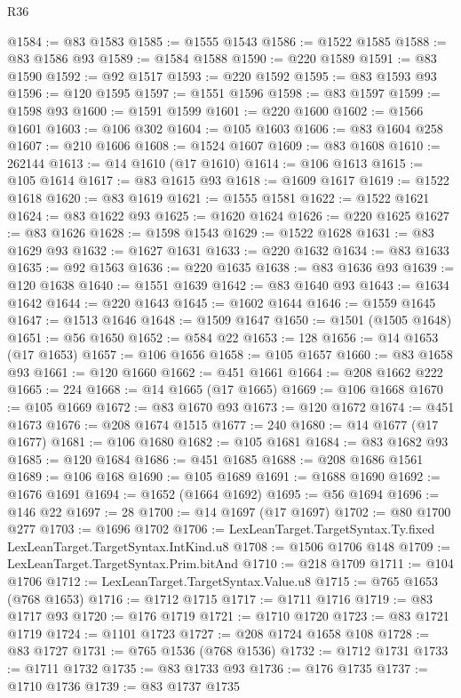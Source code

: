 \begin{lexlean}{R36}
\begin{coremodule}
@1584 := @83 @1583
@1585 := @1555 @1543
@1586 := @1522 @1585
@1588 := @83 @1586 @93
@1589 := @1584 @1588
@1590 := @220 @1589
@1591 := @83 @1590
@1592 := @92 @1517
@1593 := @220 @1592
@1595 := @83 @1593 @93
@1596 := @120 @1595
@1597 := @1551 @1596
@1598 := @83 @1597
@1599 := @1598 @93
@1600 := @1591 @1599
@1601 := @220 @1600
@1602 := @1566 @1601
@1603 := @106 @302
@1604 := @105 @1603
@1606 := @83 @1604 @258
@1607 := @210 @1606
@1608 := @1524 @1607
@1609 := @83 @1608
@1610 := 262144
@1613 := @14 @1610 (@17 @1610)
@1614 := @106 @1613
@1615 := @105 @1614
@1617 := @83 @1615 @93
@1618 := @1609 @1617
@1619 := @1522 @1618
@1620 := @83 @1619
@1621 := @1555 @1581
@1622 := @1522 @1621
@1624 := @83 @1622 @93
@1625 := @1620 @1624
@1626 := @220 @1625
@1627 := @83 @1626
@1628 := @1598 @1543
@1629 := @1522 @1628
@1631 := @83 @1629 @93
@1632 := @1627 @1631
@1633 := @220 @1632
@1634 := @83 @1633
@1635 := @92 @1563
@1636 := @220 @1635
@1638 := @83 @1636 @93
@1639 := @120 @1638
@1640 := @1551 @1639
@1642 := @83 @1640 @93
@1643 := @1634 @1642
@1644 := @220 @1643
@1645 := @1602 @1644
@1646 := @1559 @1645
@1647 := @1513 @1646
@1648 := @1509 @1647
@1650 := @1501 (@1505 @1648)
@1651 := @56 @1650
@1652 := @584 @22
@1653 := 128
@1656 := @14 @1653 (@17 @1653)
@1657 := @106 @1656
@1658 := @105 @1657
@1660 := @83 @1658 @93
@1661 := @120 @1660
@1662 := @451 @1661
@1664 := @208 @1662 @222
@1665 := 224
@1668 := @14 @1665 (@17 @1665)
@1669 := @106 @1668
@1670 := @105 @1669
@1672 := @83 @1670 @93
@1673 := @120 @1672
@1674 := @451 @1673
@1676 := @208 @1674 @1515
@1677 := 240
@1680 := @14 @1677 (@17 @1677)
@1681 := @106 @1680
@1682 := @105 @1681
@1684 := @83 @1682 @93
@1685 := @120 @1684
@1686 := @451 @1685
@1688 := @208 @1686 @1561
@1689 := @106 @168
@1690 := @105 @1689
@1691 := @1688 @1690
@1692 := @1676 @1691
@1694 := @1652 (@1664 @1692)
@1695 := @56 @1694
@1696 := @146 @22
@1697 := 28
@1700 := @14 @1697 (@17 @1697)
@1702 := @80 @1700 @277
@1703 := @1696 @1702
@1706 := LexLeanTarget.TargetSyntax.Ty.fixed LexLeanTarget.TargetSyntax.IntKind.u8
@1708 := @1506 @1706 @148
@1709 := LexLeanTarget.TargetSyntax.Prim.bitAnd
@1710 := @218 @1709
@1711 := @104 @1706
@1712 := LexLeanTarget.TargetSyntax.Value.u8
@1715 := @765 @1653 (@768 @1653)
@1716 := @1712 @1715
@1717 := @1711 @1716
@1719 := @83 @1717 @93
@1720 := @176 @1719
@1721 := @1710 @1720
@1723 := @83 @1721 @1719
@1724 := @1101 @1723
@1727 := @208 @1724 @1658 @108
@1728 := @83 @1727
@1731 := @765 @1536 (@768 @1536)
@1732 := @1712 @1731
@1733 := @1711 @1732
@1735 := @83 @1733 @93
@1736 := @176 @1735
@1737 := @1710 @1736
@1739 := @83 @1737 @1735

\end{coremodule}
\end{lexlean}
